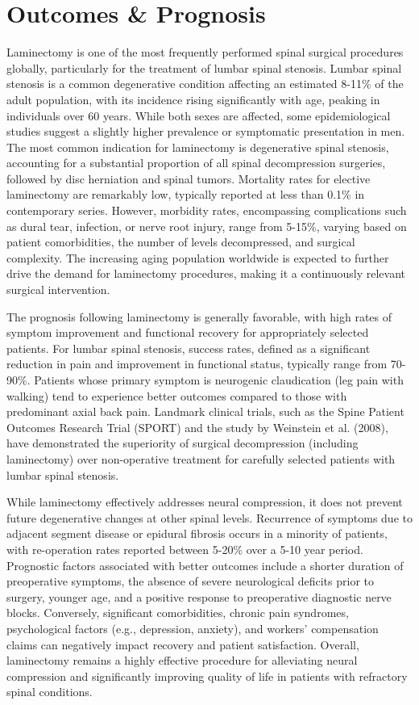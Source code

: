 \section*{Outcomes \& Prognosis}
Laminectomy is one of the most frequently performed spinal surgical procedures globally, particularly for the treatment of lumbar spinal stenosis. Lumbar spinal stenosis is a common degenerative condition affecting an estimated 8-11\% of the adult population, with its incidence rising significantly with age, peaking in individuals over 60 years. While both sexes are affected, some epidemiological studies suggest a slightly higher prevalence or symptomatic presentation in men. The most common indication for laminectomy is degenerative spinal stenosis, accounting for a substantial proportion of all spinal decompression surgeries, followed by disc herniation and spinal tumors. Mortality rates for elective laminectomy are remarkably low, typically reported at less than 0.1\% in contemporary series. However, morbidity rates, encompassing complications such as dural tear, infection, or nerve root injury, range from 5-15\%, varying based on patient comorbidities, the number of levels decompressed, and surgical complexity. The increasing aging population worldwide is expected to further drive the demand for laminectomy procedures, making it a continuously relevant surgical intervention.

The prognosis following laminectomy is generally favorable, with high rates of symptom improvement and functional recovery for appropriately selected patients. For lumbar spinal stenosis, success rates, defined as a significant reduction in pain and improvement in functional status, typically range from 70-90\%. Patients whose primary symptom is neurogenic claudication (leg pain with walking) tend to experience better outcomes compared to those with predominant axial back pain. Landmark clinical trials, such as the Spine Patient Outcomes Research Trial (SPORT) and the study by Weinstein et al. (2008), have demonstrated the superiority of surgical decompression (including laminectomy) over non-operative treatment for carefully selected patients with lumbar spinal stenosis.

While laminectomy effectively addresses neural compression, it does not prevent future degenerative changes at other spinal levels. Recurrence of symptoms due to adjacent segment disease or epidural fibrosis occurs in a minority of patients, with re-operation rates reported between 5-20\% over a 5-10 year period. Prognostic factors associated with better outcomes include a shorter duration of preoperative symptoms, the absence of severe neurological deficits prior to surgery, younger age, and a positive response to preoperative diagnostic nerve blocks. Conversely, significant comorbidities, chronic pain syndromes, psychological factors (e.g., depression, anxiety), and workers' compensation claims can negatively impact recovery and patient satisfaction. Overall, laminectomy remains a highly effective procedure for alleviating neural compression and significantly improving quality of life in patients with refractory spinal conditions.


